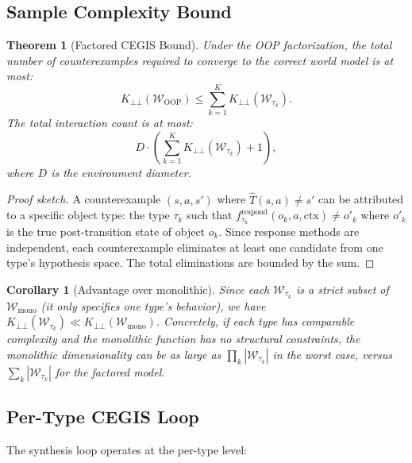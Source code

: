 \documentclass{article}
\newtheorem{theorem}{Theorem}
\newtheorem{corollary}{Corollary}
\newcommand{\calW}{\mathcal{W}}
\begin{document}
\subsection{Sample Complexity Bound}
\label{sec:bound}

\begin{theorem}[Factored CEGIS Bound]
\label{thm:factored_bound}
Under the OOP factorization, the total number of counterexamples required to
converge to the correct world model is at most:
\begin{equation}
    K_{\bot\!\!\bot}(\calW_{\text{OOP}}) \leq
        \sum_{k=1}^{K} K_{\bot\!\!\bot}(\calW_{\tau_k}).
\end{equation}
The total interaction count is at most:
\begin{equation}
    D \cdot \left(\sum_{k=1}^{K}
        K_{\bot\!\!\bot}(\calW_{\tau_k}) + 1\right),
\end{equation}
where $D$ is the environment diameter.
\end{theorem}

\begin{proof}[Proof sketch]
A counterexample $(s, a, s')$ where $\hat{T}(s, a) \neq s'$ can be attributed
to a specific object type: the type $\tau_k$ such that
$f_{\tau_k}^{\text{respond}}(o_k, a, \text{ctx}) \neq o'_k$ where $o'_k$ is
the true post-transition state of object $o_k$.  Since response methods are
independent, each counterexample eliminates at least one candidate from one
type's hypothesis space.  The total eliminations are bounded by the sum.
\end{proof}

\begin{corollary}[Advantage over monolithic]
\label{cor:advantage}
Since each $\calW_{\tau_k}$ is a strict subset of $\calW_{\text{mono}}$
(it only specifies one type's behavior), we have
$K_{\bot\!\!\bot}(\calW_{\tau_k}) \ll K_{\bot\!\!\bot}(\calW_{\text{mono}})$.
Concretely, if each type has comparable complexity and the monolithic function
has no structural constraints, the monolithic dimensionality can be as large as
$\prod_k |\calW_{\tau_k}|$ in the worst case, versus $\sum_k |\calW_{\tau_k}|$
for the factored model.
\end{corollary}

\subsection{Per-Type CEGIS Loop}
\label{sec:per_type_cegis}

The synthesis loop operates at the per-type level:
\end{document}
